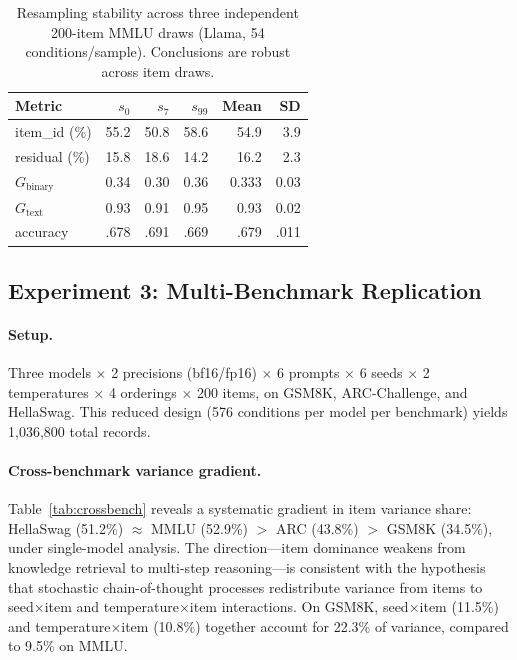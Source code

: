 \documentclass[letterpaper,11pt]{article}
\begin{document}
\begin{table}[t]
\centering
\caption{Resampling stability across three independent 200-item MMLU draws (Llama, 54 conditions/sample). Conclusions are robust across item draws.}
\label{tab:resample}
\small
\begin{tabular}{@{}l rrr rr@{}}
\toprule
Metric & $s_0$ & $s_7$ & $s_{99}$ & Mean & SD \\
\midrule
item\_id (\%)   & 55.2 & 50.8 & 58.6 & 54.9 & 3.9 \\
residual (\%)   & 15.8 & 18.6 & 14.2 & 16.2 & 2.3 \\
$G_\text{binary}$      & 0.34 & 0.30 & 0.36 & 0.333 & 0.03 \\
$G_\text{text}$   & 0.93 & 0.91 & 0.95 & 0.93  & 0.02 \\
accuracy        & .678 & .691 & .669 & .679  & .011 \\
\bottomrule
\end{tabular}
\end{table}

\subsection{Experiment 3: Multi-Benchmark Replication}
\label{sec:exp2}

\paragraph{Setup.}
Three models $\times$ 2 precisions (bf16/fp16) $\times$ 6 prompts $\times$ 6 seeds $\times$ 2 temperatures $\times$ 4 orderings $\times$ 200 items, on GSM8K, ARC-Challenge, and HellaSwag.
This reduced design (576 conditions per model per benchmark) yields 1{,}036{,}800 total records.

\paragraph{Cross-benchmark variance gradient.}
Table~\ref{tab:crossbench} reveals a systematic gradient in item variance share: HellaSwag (51.2\%) $\approx$ MMLU (52.9\%) $>$ ARC (43.8\%) $>$ GSM8K (34.5\%), under single-model analysis.
The direction---item dominance weakens from knowledge retrieval to multi-step reasoning---is consistent with the hypothesis that stochastic chain-of-thought processes redistribute variance from items to seed$\times$item and temperature$\times$item interactions.
On GSM8K, seed$\times$item (11.5\%) and temperature$\times$item (10.8\%) together account for 22.3\% of variance, compared to 9.5\% on MMLU.
\end{document}
